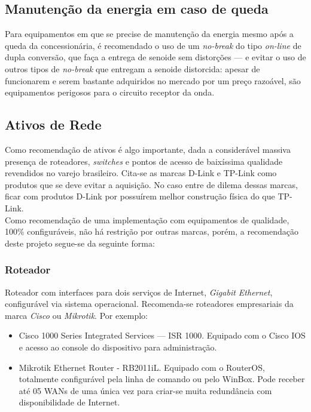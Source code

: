 \documentclass[	DIV=calc,%
							paper=a4,%
							fontsize=12pt,%
							onecolumn]{scrartcl}	 					%
\begin{document}
\subsection{Manutenção da energia em caso de queda}

Para equipamentos em que se precise de manutenção da energia mesmo após a queda da concessionária, é recomendado o uso de um \textit{no-break} do tipo \textit{on-line} de dupla conversão, que faça a entrega de senoide sem distorções --- e evitar o uso de outros tipos de \textit{no-break} que entregam a senoide distorcida: apesar de funcionarem e serem bastante adquiridos no mercado por um preço razoável, são equipamentos perigosos para o circuito receptor da onda.

\subsection{Ativos de Rede}

Como recomendação de ativos é algo importante, dada a considerável massiva presença de roteadores, \textit{switches} e pontos de acesso de baixíssima qualidade revendidos no varejo brasileiro. Cita-se as marcas D-Link e TP-Link como produtos que se deve evitar a aquisição. No caso entre de dilema dessas marcas, ficar com produtos D-Link por possuírem melhor construção física do que TP-Link. 
\\

Como recomendação de uma implementação com equipamentos de qualidade, 100\% configuráveis, não há restrição por outras marcas, porém, a recomendação deste projeto segue-se da seguinte forma:

\subsubsection{Roteador}

Roteador com interfaces para dois serviços de Internet, \textit{Gigabit Ethernet}, configurável via sistema operacional. Recomenda-se roteadores empresariais da marca \textit{Cisco} ou \textit{Mikrotik}. Por exemplo:

\begin{itemize}
\item{Cisco 1000 Series Integrated Services --- ISR 1000}. Equipado com o Cisco IOS e acesso ao console do dispositivo para administração.
\item{Mikrotik Ethernet Router - RB2011iL}. Equipado com o RouterOS, totalmente configurável pela linha de comando ou pelo WinBox. Pode receber até 05 WANs de uma única vez para criar-se muita redundância com disponibilidade de Internet. 
\end{itemize}
\end{document}
